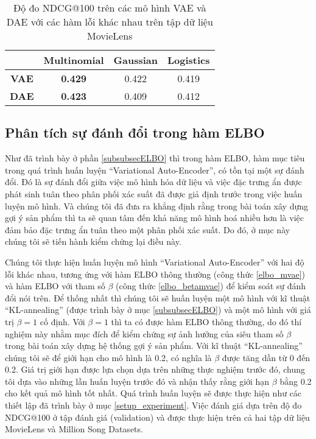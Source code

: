     \begin{table}[]
    \centering
        \begin{tabular}{|c|c|c|c|}
        \hline
                        & \textbf{Multinomial}                  & \textbf{Gaussian}            & \textbf{Logistics}           \\ \hline
        \textbf{VAE} &  \textbf{0.429} & 0.422 &  0.419 \\ \hline
        \textbf{DAE}  & \textbf{0.423}                        & 0.409                        & 0.412                        \\ \hline
        \end{tabular}
    
    \caption[Kết quả mô hình với các hàm lỗi khác nhau]{Độ đo NDCG@100 trên các mô hình VAE và DAE với các hàm lỗi khác nhau trên tập dữ liệu MovieLens}
    \label{table:comparell}
    \end{table}   
   
   \subsection{Phân tích sự đánh đổi trong hàm ELBO}
   Như đã trình bày ở phần \ref{subsubsecELBO} thì trong hàm ELBO, hàm mục tiêu trong quá trình huấn luyện ``Variational Auto-Encoder'', có tồn tại một sự đánh đổi.
   Đó là sự đánh đổi giữa việc mô hình hóa dữ liệu và việc đặc trưng ẩn được phát sinh tuân theo phân phối xác suất đã được giả định trước trong việc huấn luyện mô hình.
   Và chúng tôi đã đưa ra khẳng định rằng trong bài toán xây dựng gợi ý sản phẩm thì ta sẽ quan tâm đến khả năng mô hình hoá nhiều hơn là việc đảm bảo đặc trưng ẩn tuân theo một phân phối xác suất.
   Do đó, ở mục này chúng tôi sẽ tiến hành kiểm chứng lại điều này.

   Chúng tôi thực hiện huấn luyện mô hình ``Variational Auto-Encoder'' với hai độ lỗi khác nhau, tương ứng với hàm ELBO thông thường (công thức \ref{elbo_mvae}) và hàm ELBO với tham số $\beta$ (công thức \ref{elbo_betamvae}) để kiểm soát sự đánh đổi nói trên.
   Để thống nhất thì chúng tôi sẽ huấn luyện một mô hình với kĩ thuật ``KL-annealing'' (được trình bày ở mục \ref{subsubsecELBO}) và một mô hình với giá trị $\beta =1$ cố định.
   Với $\beta = 1$ thì ta có được hàm ELBO thông thường, do đó thí nghiệm này nhằm mục đích để kiểm chứng sự ảnh hưởng của siêu tham số $\beta$ trong bài toán xây dựng hệ thống gợi ý sản phẩm.
   Với kĩ thuật ``KL-annealing'' chúng tôi sẽ để giới hạn cho mô hình là 0.2, có nghĩa là $\beta$ được tăng dần từ 0 đến 0.2.
   Giá trị giới hạn được lựa chọn dựa trên những thực nghiệm trước đó, chung tôi dựa vào những lần huấn luyện trước đó và nhận thấy rằng giới hạn $\beta$ bằng 0.2 cho kết quả mô hình tốt nhất.
   Quá trình huấn luyện sẽ được thực hiện như các thiết lập đã trình bày ở mục \ref{setup_experiment}.
   Việc đánh giá dựa trên độ đo NDCG@100 ở tập đánh giá (validation) và được thực hiện trên cả hai tập dữ liệu MovieLens và Million Song Datasets. 
   
